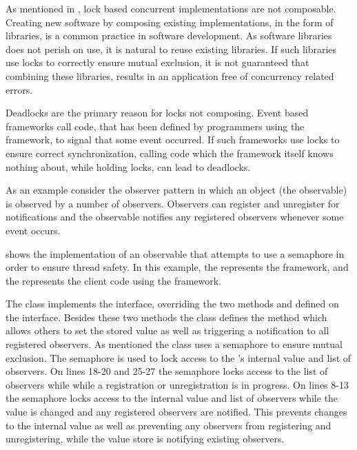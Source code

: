 As mentioned in , lock based concurrent implementations are not composable. Creating new software by composing existing implementations, in the form of libraries, is a common practice in software development. As software libraries does not perish on use, it is natural to reuse existing libraries. If such libraries use locks to correctly ensure mutual exclusion, it is not guaranteed that combining these libraries, results in an application free of concurrency related errors.

Deadlocks are the primary reason for locks not composing\cite[p. 58]{sutter2005software}. Event based frameworks call code, that has been defined by programmers using the framework, to signal that some event occurred. If such frameworks use locks to ensure correct synchronization, calling code which the framework itself knows nothing about, while holding locks, can lead to deadlocks.

As an example consider the observer pattern\cite{gamma1994design} in which an object (the observable) is observed by a number of observers. Observers can register and unregister for notifications and the observable notifies any registered observers whenever some event occurs. 

 shows the implementation of an observable that attempts to use a semaphore in order to ensure thread safety. In this example, the  represents the framework, and the  represents the client code using the framework. 

The  class implements the  interface, overriding the two methods  and  defined on the interface. Besides these two methods the  class defines the  method which allows others to set the stored value as well as triggering a notification to all registered observers. As mentioned the  class uses a semaphore to ensure mutual exclusion. The semaphore is used to lock access to the 's internal value and list of observers. On lines 18-20 and 25-27 the semaphore locks access to the list of observers while while a registration or unregistration is in progress. On lines 8-13 the semaphore locks access to the internal value and list of observers while the value is changed and any registered observers are notified. This prevents changes to the internal value as well as preventing any observers from registering and unregistering, while the value store is notifying existing observers.

